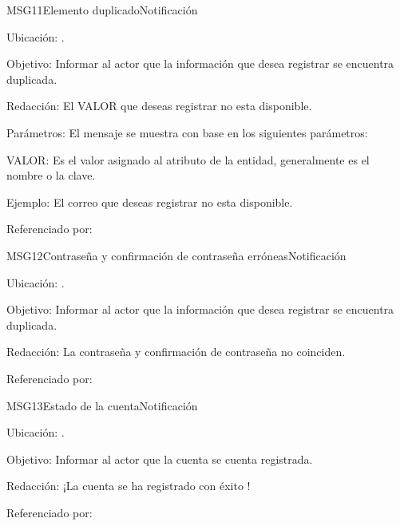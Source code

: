 \begin{mensaje}{MSG11}{Elemento duplicado}{Notificación}
	\item[Ubicación:] \msjEmergente.
	\item[Objetivo:] Informar al actor que la información que desea registrar se encuentra duplicada.
	\item[Redacción:] El VALOR que deseas registrar no esta disponible.
	\item[Parámetros:] El mensaje se muestra con base en los siguientes parámetros:
	\begin{Citemize}
		\item VALOR: Es el valor asignado al atributo de la entidad, generalmente es el nombre o la clave.
	\end{Citemize}
	\item[Ejemplo:] El correo que deseas registrar no esta disponible.
	\item[Referenciado por:] 
\end{mensaje}

\begin{mensaje}{MSG12}{Contraseña y confirmación de contraseña erróneas}{Notificación}
	\item[Ubicación:] \msjEmergente.
	\item[Objetivo:] Informar al actor que la información que desea registrar se encuentra duplicada.
	\item[Redacción:] La contraseña y confirmación de contraseña no coinciden.
	\item[Referenciado por:] 
\end{mensaje}

\begin{mensaje}{MSG13}{Estado de la cuenta}{Notificación}
	\item[Ubicación:] \msjEmergente.
	\item[Objetivo:] Informar al actor que la cuenta se cuenta registrada.
	\item[Redacción:] ¡La cuenta se ha registrado con éxito !
	\item[Referenciado por:] 
\end{mensaje}



